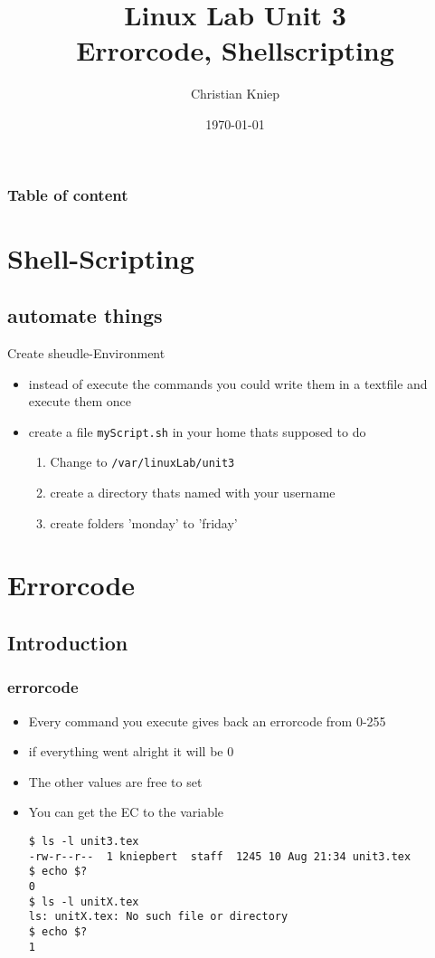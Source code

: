 \documentclass[hyperref={pdfpagelabels=false}]{beamer}
\author{Christian Kniep}
\newcommand{\code}[1]{\colorbox{lGray}{\texttt{#1}}}
\begin{document}
\title[Linux Lab Unit 2]{Linux Lab Unit 3 \\ Errorcode, Shellscripting}  
\date[\today]{\today} 

\begin{frame}
	\titlepage
\end{frame} 

\begin{frame}
	\frametitle{Table of content}
	\tableofcontents
\end{frame} 

\section{Shell-Scripting}
    \subsection{automate things}
    \begin{frame}{Create sheudle-Environment}
        \begin{itemize}
            \item<1-> instead of execute the commands you could write them in a textfile and execute them once
            \item<2-> create a file \code{myScript.sh} in your home thats supposed to do
            \begin{enumerate}
                \item<2-> Change to \code{/var/linuxLab/unit3}
                \item<3-> create a directory thats named with your username
                \item<4-> create folders 'monday' to 'friday'
            \end{enumerate}
        \end{itemize}
    \end{frame}
\section{Errorcode} 
	\subsection{Introduction}
		\begin{frame}[fragile]
			\frametitle{errorcode}
			\begin{itemize}
				\item<1-> Every command you execute gives back an errorcode from 0-255
                \item<2-> if everything went alright it will be 0
                \item<3-> The other values are free to set
                \item<4-> You can get the EC to the variable 
                    \begin{verbatim}
$ ls -l unit3.tex 
-rw-r--r--  1 kniepbert  staff  1245 10 Aug 21:34 unit3.tex
$ echo $?
0
$ ls -l unitX.tex 
ls: unitX.tex: No such file or directory
$ echo $?
1
\end{verbatim}
            \end{itemize}
		\end{frame}
\end{document}
